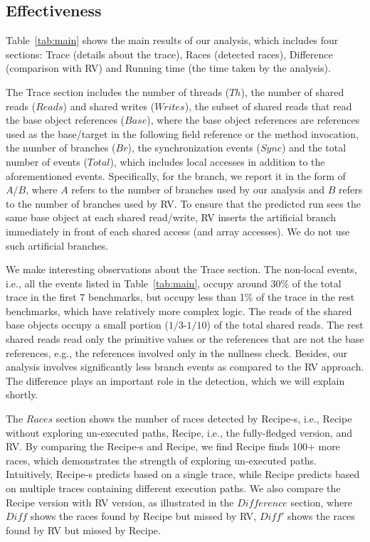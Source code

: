 







\subsection{Effectiveness}
Table~\ref{tab:main} shows the main results of our analysis, which includes four sections: Trace (details about the trace), Races (detected races), Difference (comparison with RV) and Running time (the time taken by the analysis).


The Trace section includes the number of threads ($Th$), the number of shared reads ($Reads$) and shared writes ($Writes$), the subset of shared reads that read the base object references  ($Base$), where the  base object references are references used as the base/target in the following field reference or the method invocation,  the number of branches ($Br$), the synchronization events ($Sync$) and the total number of events ($Total$), which includes local accesses in addition to the aforementioned events. Specifically, for the branch, we report it in the form of $A/B$, where $A$ refers to the number of branches used by our analysis and $B$ refers to the number of branches used by RV. To ensure that the predicted run sees the same base object at each shared read/write, {\sf RV} inserts the artificial branch immediately in front of each shared access (and array accesses). We do not use such artificial branches.


We make interesting observations about the Trace section. The non-local events, i.e., all the events listed in Table~\ref{tab:main}, occupy around 30\% of the total trace in the first 7 benchmarks, but occupy less than 1\% of the trace in the rest benchmarks, which have relatively more complex logic. The reads of the shared base objects occupy a small portion ($1/3$-$1/10$) of the total shared reads. The rest shared reads read only the primitive values or 
the references that are not the base references, e.g., the references involved only in the nullness check. Besides, our analysis involves significantly less branch events as compared to the {\sf RV} approach. The difference plays an important role in the detection, which we will explain shortly.


The $Races$ section shows the number of races detected by {\sf Recipe-s}, i.e., {\sf Recipe} without exploring un-executed paths, {\sf Recipe}, i.e., the fully-fledged version, and {\sf RV}. By comparing the {\sf Recipe-s} and {\sf Recipe}, we find {\sf Recipe} finds 100+ more races, which demonstrates the strength of exploring  un-executed paths. Intuitively,  {\sf Recipe-s} predicts based on a single trace, while {\sf Recipe} predicts based on multiple traces containing different execution paths. We also compare the {\sf Recipe} version with {\sf RV} version, as illustrated in the $Difference$ section, where $Diff$ shows the races found by {\sf Recipe} but missed by {\sf RV}, $Diff'$ shows the races found by {\sf RV} but missed by {\sf Recipe}.

